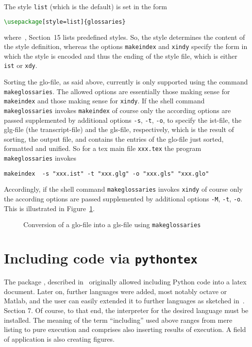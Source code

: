 The style \texttt{list} (which is the default) is set in the form 
%
\begin{lstlisting}[language=TeX]
\usepackage[style=list]{glossaries}
\end{lstlisting}
%
where~\cite{GloP}, Section~15 lists predefined styles. 
So, the style determines the content of the style definition, 
whereas the options \texttt{makeindex} and \texttt{xindy} 
specify the form in which the style is encoded 
and thus the ending of the style file, 
which is either \texttt{ist} or \texttt{xdy}. 

Sorting the glo-file, as said above, 
currently is only supported using the command \texttt{makeglossaries}. 
The allowed options are essentially those 
making sense for \texttt{makeindex} and those making sense for \texttt{xindy}. 
If the shell command \texttt{makeglossaries} 
invokes \texttt{makeindex} of course only the according options 
are passed supplemented by additional options 
\texttt{-s}, \texttt{-t}, \texttt{-o}, to specify the
ist-file, the glg-file (the transcript-file) and the gls-file,
respectively, 
which is the result of sorting, the output file, 
and contains the entries of the glo-file 
just sorted, formatted and unified.
So for a tex main file \texttt{xxx.tex} the program 
\texttt{makeglossaries} invokes
%
\begin{verbatim}
makeindex  -s "xxx.ist" -t "xxx.glg" -o "xxx.gls" "xxx.glo"
\end{verbatim}
%
Accordingly, if the shell command \texttt{makeglossaries} 
invokes \texttt{xindy} of course only the according options 
are passed supplemented by additional options 
\texttt{-M}, \texttt{-t}, \texttt{-o}. 
This is illustrated in Figure~\ref{fig:glo2gls}. 


\begin{figure}[htb]
\centering
{}
\caption{\label{fig:glo2gls}Conversion of a glo-file into a gls-file 
using \texttt{makeglossaries}}
\end{figure}


\section{Including code via \texttt{pythontex}}\label{sec:pythontex}

The package , described in~\cite{PythonTexP} 
originally allowed including Python code into a latex document. 
Later on, further languages were added, most notably octave or Matlab, 
and the user can easily extended it to further languages 
as sketched in~\cite{PythonTexP}. Section 7. 
Of course, to that end, the interpreter for the desired language must be installed.
The meaning of the term ``including'' used above 
ranges from mere listing to pure execution and comprises also inserting results of execution. 
A field of application is also creating figures. 

